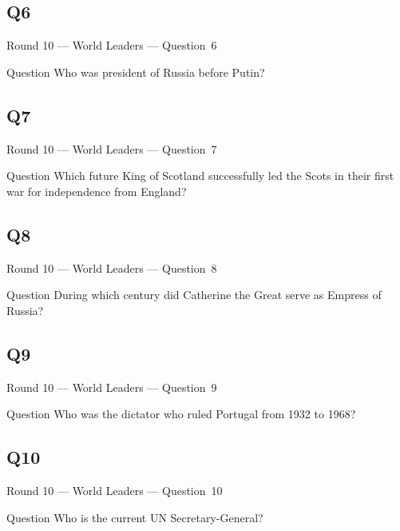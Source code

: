 \documentclass[11pt]{beamer}
\begin{document}
\subsection*{Q6}
\begin{frame}[t]{Round 10 --- World Leaders --- \mbox{Question 6}}
\vspace{-0.5em}
\begin{block}{Question}
Who was president of Russia before Putin?
\end{block}
\end{frame}
\subsection*{Q7}
\begin{frame}[t]{Round 10 --- World Leaders --- \mbox{Question 7}}
\vspace{-0.5em}
\begin{block}{Question}
Which future King of Scotland successfully led the Scots in their first war for independence from England?
\end{block}
\end{frame}
\subsection*{Q8}
\begin{frame}[t]{Round 10 --- World Leaders --- \mbox{Question 8}}
\vspace{-0.5em}
\begin{block}{Question}
During which century did Catherine the Great serve as Empress of Russia?
\end{block}
\end{frame}
\subsection*{Q9}
\begin{frame}[t]{Round 10 --- World Leaders --- \mbox{Question 9}}
\vspace{-0.5em}
\begin{block}{Question}
Who was the dictator who ruled Portugal from 1932 to 1968?
\end{block}
\end{frame}
\subsection*{Q10}
\begin{frame}[t]{Round 10 --- World Leaders --- \mbox{Question 10}}
\vspace{-0.5em}
\begin{block}{Question}
Who is the current UN Secretary-General?
\end{block}
\end{frame}
\end{document}
